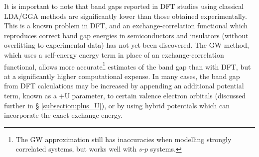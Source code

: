It is important to note that band gaps reported in DFT studies using classical LDA/GGA methods are significantly lower than those obtained experimentally. This is a known problem in DFT, and an exchange-correlation functional which reproduces correct band gap energies in semiconductors and insulators (without overfitting to experimental data) has not yet been discovered. The GW method, which uses a self-energy energy term in place of an exchange-correlation functional, allows more accurate\footnote{The GW approximation still has inaccuracies when modelling strongly correlated systems, but works well with $s$-$p$ systems.} estimates of the band gap than with DFT, but at a significantly higher computational expense. In many cases, the band gap from DFT calculations may be increased by appending an additional potential term, known as a +U parameter, to certain valence electron orbitals (discussed further in § \ref{subsection:plus_U}), or by using hybrid potentials which can incorporate the exact exchange energy.








